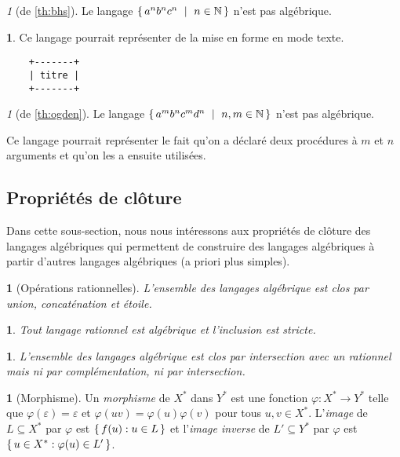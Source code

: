 \documentclass[10pt,a4paper,notitlepage]{article}
\theoremstyle{plain}
\theoremstyle{definition}
\newtheorem{defn}[thm]{\protect\definitionname}
\theoremstyle{definition}
\newtheorem{example}[thm]{\protect\examplename}
\theoremstyle{remark}
\newtheorem{application}[thm]{\protect\applicationname}
\theoremstyle{remark}
\theoremstyle{plain}
\theoremstyle{plain}
\newtheorem{prop}[thm]{\protect\propositionname}
\theoremstyle{plain}
\theoremstyle{remark}
\providecommand{\definitionname}{Définition}
\providecommand{\examplename}{Exemple}
\providecommand{\applicationname}{Application}
\providecommand{\propositionname}{Proposition}
\begin{document}
\begin{application}[de \ref{th:bhs}]
	Le langage $\set{a^{n}b^{n}c^{n}\ |\ n\in\mathbb{N}}$ n'est pas algébrique.
\end{application}

\begin{example}
	Ce langage pourrait représenter de la mise en forme en mode texte. \begin{lstlisting}
	+-------+
	| titre |
	+-------+
	\end{lstlisting}
\end{example}

\begin{application}[de \ref{th:ogden}]
	Le langage $\set{a^{m}b^{n}c^{m}d^{n}\ |\ n,m\in\mathbb{N}}$ n'est pas algébrique.
	
	Ce langage pourrait représenter le fait qu'on a déclaré deux procédures
	à $m$ et $n$ arguments et qu'on les a ensuite utilisées. %
\end{application}

\subsection{Propriétés de clôture}

Dans cette sous-section, nous nous intéressons aux propriétés de clôture des langages algébriques qui permettent de construire des langages algébriques à partir d'autres langages algébriques (a priori plus simples).

\begin{prop}[Opérations rationnelles]
	L'ensemble des langages algébrique est clos par union, concaténation et étoile.
\end{prop}

\begin{prop}
	Tout langage rationnel est algébrique et l'inclusion est stricte.
\end{prop}

\begin{prop}
	L'ensemble des langages algébrique est clos par intersection avec un rationnel mais ni par complémentation, ni par intersection.
\end{prop}

\begin{defn}[Morphisme]
	Un \emph{morphisme} de $X^*$ dans $Y^*$ est une fonction $\varphi:X^*\to Y^*$ telle que $\varphi(\varepsilon) = \varepsilon$ et $\varphi(uv)=\varphi(u)\varphi(v)$ pour tous $u,v\in X ^*$. L'\emph{image} de $L\subseteq X^*$ par $\varphi$ est $\set{f(u) : u \in L}$ et l'\emph{image inverse} de $L'\subseteq Y^*$ par $\varphi$ est $\set{u \in X^* : \varphi(u) \in L'}$.
\end{defn}
\end{document}
